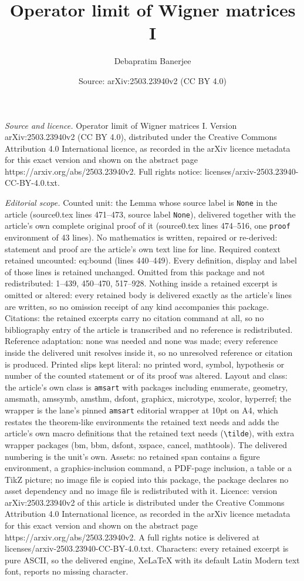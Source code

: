 \documentclass[10pt,a4paper]{amsart}
\title[Operator limit of Wigner matrices I]{Operator limit of Wigner matrices I}
\author{Debapratim Banerjee}
\date{Source: arXiv:2503.23940v2 (CC BY 4.0)}
\begin{document}
\maketitle

\noindent\emph{Source and licence.} Operator limit of Wigner matrices I. Version arXiv:2503.23940v2 (CC BY 4.0), distributed under the Creative Commons Attribution 4.0 International licence, as recorded in the arXiv licence metadata for this exact version and shown on the abstract page https://arxiv.org/abs/2503.23940v2. Full rights notice: licenses/arxiv-2503.23940-CC-BY-4.0.txt.\par\smallskip

\noindent\textit{Editorial scope.} Counted unit: the Lemma whose source label is \texttt{None} in the article (source0.tex lines 471--473, source label \texttt{None}), delivered together with the article's own complete original proof of it (source0.tex lines 474--516, one \texttt{proof} environment of 43 lines). No mathematics is written, repaired or re-derived: statement and proof are the article's own text line for line. Required context retained uncounted: eq:bound (lines 440--449). Every definition, display and label of those lines is retained unchanged. Omitted from this package and not redistributed: 1--439, 450--470, 517--928. Nothing inside a retained excerpt is omitted or altered: every retained body is delivered exactly as the article's lines are written, so no omission receipt of any kind accompanies this package. Citations: the retained excerpts carry no citation command at all, so no bibliography entry of the article is transcribed and no reference is redistributed. Reference adaptation: none was needed and none was made; every reference inside the delivered unit resolves inside it, so no unresolved reference or citation is produced. Printed slips kept literal: no printed word, symbol, hypothesis or number of the counted statement or of its proof was altered. Layout and class: the article's own class is \texttt{amsart} with packages including enumerate, geometry, amsmath, amssymb, amsthm, dsfont, graphicx, microtype, xcolor, hyperref; the wrapper is the lane's pinned \texttt{amsart} editorial wrapper at 10pt on A4, which restates the theorem-like environments the retained text needs and adds the article's own macro definitions that the retained text needs (\texttt{\textbackslash tilde}), with extra wrapper packages (bm, bbm, dsfont, xspace, cancel, mathtools). The delivered numbering is the unit's own. Assets: no retained span contains a figure environment, a graphics-inclusion command, a PDF-page inclusion, a table or a TikZ picture; no image file is copied into this package, the package declares no asset dependency and no image file is redistributed with it. Licence: version arXiv:2503.23940v2 of this article is distributed under the Creative Commons Attribution 4.0 International licence, as recorded in the arXiv licence metadata for this exact version and shown on the abstract page https://arxiv.org/abs/2503.23940v2. A full rights notice is delivered at licenses/arxiv-2503.23940-CC-BY-4.0.txt. Characters: every retained excerpt is pure ASCII, so the delivered engine, XeLaTeX with its default Latin Modern text font, reports no missing character.
\end{document}
